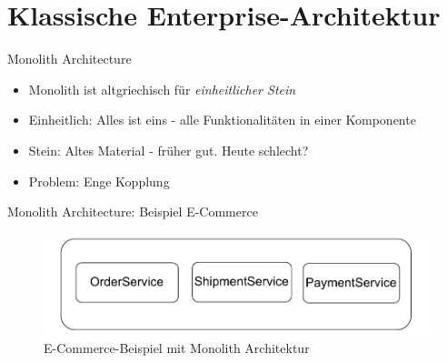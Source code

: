 \section{Klassische Enterprise-Architektur}


\begin{frame}{Monolith Architecture}
    \begin{itemize}
        \item Monolith ist altgriechisch für \textit{einheitlicher Stein}
        \item Einheitlich: Alles ist eins - alle Funktionalitäten in einer Komponente
        \item Stein: Altes Material - früher gut. Heute schlecht?
        \item Problem: Enge Kopplung
    \end{itemize}
\end{frame}

\begin{frame}{Monolith Architecture: Beispiel E-Commerce}
    \begin{figure}[!h]
        \centering
        \includegraphics[scale=0.70]{imglib/mono/mono}
        \caption{E-Commerce-Beispiel mit Monolith Architektur}
        \label{fig:mono-ecommerce}
    \end{figure}
\end{frame}

